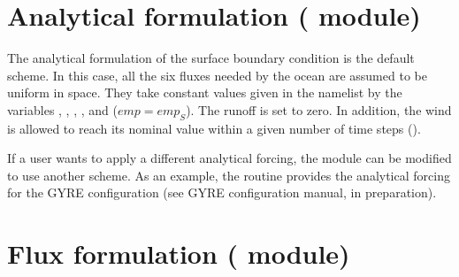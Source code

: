 \documentclass[NEMO_book]{subfiles}
\begin{document}



\section  [Analytical formulation (\textit{sbcana}) ]
		{Analytical formulation ( module) }
\label{SBC_ana}


The analytical formulation of the surface boundary condition is the default scheme.
In this case, all the six fluxes needed by the ocean are assumed to 
be uniform in space. They take constant values given in the namelist 
 by the variables , , , 
, and  ($\textit{emp}=\textit{emp}_S$). The runoff is set to zero. 
In addition, the wind is allowed to reach its nominal value within a given number 
of time steps ().

If a user wants to apply a different analytical forcing, the  
module can be modified to use another scheme. As an example, 
the  routine provides the analytical forcing for the 
GYRE configuration (see GYRE configuration manual, in preparation).


\section  [Flux formulation (\textit{sbcflx}) ]
		{Flux formulation ( module) }
\label{SBC_flx}
\end{document}
